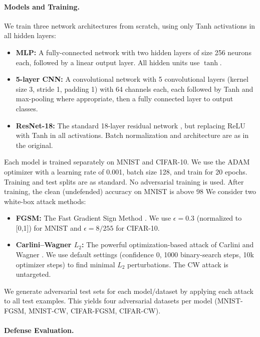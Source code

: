 \documentclass{llncs}
\begin{document}
\paragraph{Models and Training.}
We train three network architectures from scratch, using only Tanh activations in all hidden layers:
\begin{itemize}
\item \textbf{MLP:} A fully-connected network with two hidden layers of size 256 neurons each, followed by a linear output layer. All hidden units use $\tanh$.
\item \textbf{5-layer CNN:} A convolutional network with 5 convolutional layers (kernel size 3, stride 1, padding 1) with 64 channels each, each followed by Tanh and max-pooling where appropriate, then a fully connected layer to output classes.
\item \textbf{ResNet-18:} The standard 18-layer residual network \cite{He2016}, but replacing ReLU with Tanh in all activations. Batch normalization and architecture are as in the original.
\end{itemize}
Each model is trained separately on MNIST and CIFAR-10. We use the ADAM optimizer with a learning rate of 0.001, batch size 128, and train for 20 epochs. Training and test splits are as standard. No adversarial training is used. After training, the clean (undefended) accuracy on MNIST is above 98%
We consider two white-box attack methods:
\begin{itemize}
\item \textbf{FGSM:} The Fast Gradient Sign Method \cite{Goodfellow2015}. We use $\epsilon=0.3$ (normalized to [0,1]) for MNIST and $\epsilon=8/255$ for CIFAR-10.
\item \textbf{Carlini–Wagner $L_2$:} The powerful optimization-based attack of Carlini and Wagner \cite{CarliniWagner2017}. We use default settings (confidence 0, 1000 binary-search steps, 10k optimizer steps) to find minimal $L_2$ perturbations. The CW attack is untargeted.
\end{itemize}
We generate adversarial test sets for each model/dataset by applying each attack to all test examples. This yields four adversarial datasets per model (MNIST-FGSM, MNIST-CW, CIFAR-FGSM, CIFAR-CW). \paragraph{Defense Evaluation.}
\end{document}
